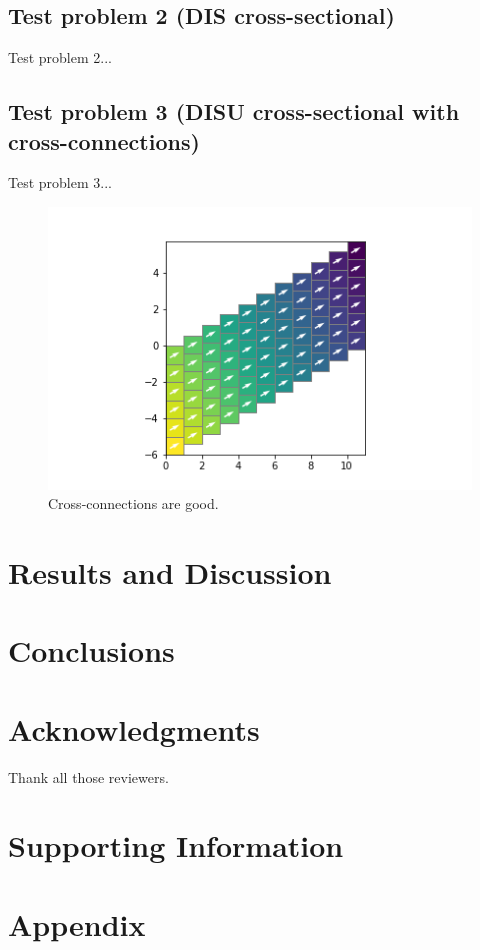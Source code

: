 \documentclass{article}
\begin{document}
\subsection{Test problem 2 (DIS cross-sectional)}

Test problem 2...

\subsection{Test problem 3 (DISU cross-sectional with cross-connections)}

Test problem 3...

\begin{figure}
	\begin{center}
	\includegraphics{../figures/mymodel-x-cc-head.png}
	\caption{Cross-connections are good.}
	\label{fig:mymodel-head}
	\end{center}
\end{figure}

\section{Results and Discussion}

\section{Conclusions}

\section{Acknowledgments}
Thank all those reviewers.

\section{Supporting Information}

\section{Appendix}


\end{document}
